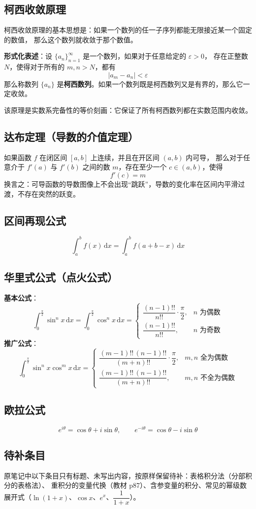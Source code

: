 \subsection{柯西收敛原理}
柯西收敛原理的基本思想是：如果一个数列的任一子序列都能无限接近某一个固定的数值，
那么这个数列就收敛于那个数值。

\textbf{形式化表述}：设 $\{a_n\}_{n=1}^{\infty}$ 是一个数列，如果对于任意给定的 $\varepsilon>0$，
存在正整数 $N$，使得对于所有的 $m,n>N$，都有
\[
|a_m-a_n|<\varepsilon
\]
那么称数列 $\{a_n\}$ 是\textbf{柯西数列}。如果一个数列既是柯西数列又是有界的，那么它一定收敛。

\noindent 该原理是实数系完备性的等价刻画：它保证了所有柯西数列都在实数范围内收敛。

\subsection{达布定理（导数的介值定理）}
如果函数 $f$ 在闭区间 $[a,b]$ 上连续，并且在开区间 $(a,b)$ 内可导，
那么对于任意介于 $f'(a)$ 与 $f'(b)$ 之间的数 $m$，存在至少一个 $c\in(a,b)$，使得
\[
f'(c)=m
\]
换言之：可导函数的导数图像上不会出现“跳跃”，导数的变化率在区间内平滑过渡，不存在突然的跃变。

\subsection{区间再现公式}
\[
\int_a^b f(x)\,\mathrm{d}x=\int_a^b f(a+b-x)\,\mathrm{d}x
\]

\subsection{华里式公式（点火公式）}
\textbf{基本公式}：
\[
\int_0^{\frac{\pi}{2}}\sin^n x\,\mathrm{d}x=\int_0^{\frac{\pi}{2}}\cos^n x\,\mathrm{d}x=
\begin{cases}
\dfrac{(n-1)!!}{n!!}\cdot\dfrac{\pi}{2}, & n \text{ 为偶数}\\[2mm]
\dfrac{(n-1)!!}{n!!}, & n \text{ 为奇数}
\end{cases}
\]
\textbf{推广公式}：
\[
\int_0^{\frac{\pi}{2}}\sin^n x\cos^m x\,\mathrm{d}x=
\begin{cases}
\dfrac{(m-1)!!\,(n-1)!!}{(m+n)!!}\cdot\dfrac{\pi}{2}, & m,n \text{ 全为偶数}\\[2mm]
\dfrac{(m-1)!!\,(n-1)!!}{(m+n)!!}, & m,n \text{ 不全为偶数}
\end{cases}
\]

\subsection{欧拉公式}
\[
e^{i\theta}=\cos\theta+i\sin\theta,\qquad e^{-i\theta}=\cos\theta-i\sin\theta
\]

\subsection{待补条目}
原笔记中以下条目只有标题、未写出内容，按原样保留待补：表格积分法（分部积分的表格法）、
重积分的变量代换（教材 p87）、含参变量的积分、常见的幂级数展开式（$\ln(1+x)$、$\cos x$、$e^x$、$\dfrac{1}{1+x}$）。
